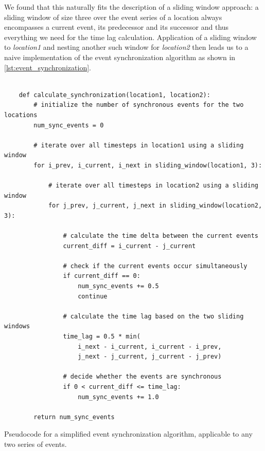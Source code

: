 We found that this naturally fits the description of a sliding window approach: a sliding window of size three over the event series of a location always encompasses a current event, its predecessor and its successor and thus everything we need for the time lag calculation. Application of a sliding window to \textit{location1} and nesting another such window for \textit{location2} then leads us to a naive implementation of the event synchronization algorithm as shown in \cref{lst:event_synchronization}.

\begin{listing}[H]
  \begin{verbatim}

    def calculate_synchronization(location1, location2):
        # initialize the number of synchronous events for the two locations
        num_sync_events = 0

        # iterate over all timesteps in location1 using a sliding window
        for i_prev, i_current, i_next in sliding_window(location1, 3):

            # iterate over all timesteps in location2 using a sliding window
            for j_prev, j_current, j_next in sliding_window(location2, 3):

                # calculate the time delta between the current events
                current_diff = i_current - j_current

                # check if the current events occur simultaneously
                if current_diff == 0:
                    num_sync_events += 0.5
                    continue

                # calculate the time lag based on the two sliding windows
                time_lag = 0.5 * min(
                    i_next - i_current, i_current - i_prev,
                    j_next - j_current, j_current - j_prev)

                # decide whether the events are synchronous
                if 0 < current_diff <= time_lag:
                    num_sync_events += 1.0

        return num_sync_events

  \end{verbatim}
  \caption{Pseudocode for a simplified event synchronization algorithm, applicable to any two series of events.}
  \label{lst:event_synchronization}
\end{listing}

